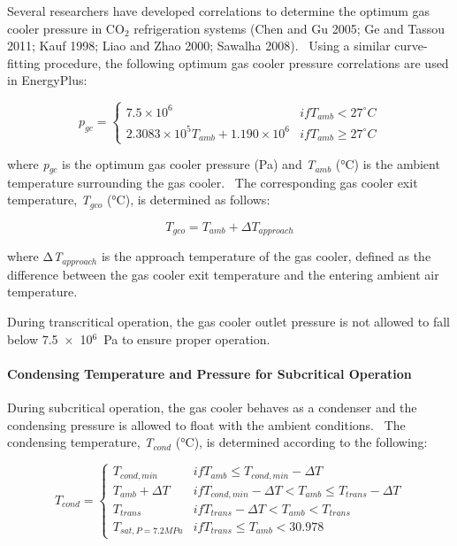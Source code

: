 Several researchers have developed correlations to determine the optimum gas cooler pressure in CO\(_{2}\) refrigeration systems (Chen and Gu 2005; Ge and Tassou 2011; Kauf 1998; Liao and Zhao 2000; Sawalha 2008).~ Using a similar curve-fitting procedure, the following optimum gas cooler pressure correlations are used in EnergyPlus:

\begin{equation}
  p_{gc} = \left\{
             \begin{array}{cl}
               7.5 \times 10^6                                & if T_{amb} <    27^{\circ}C \\
               2.3083 \times 10^5 T_{amb} + 1.190 \times 10^6 & if T_{amb} \geq 27^{\circ}C
             \end{array}
           \right.
\end{equation}

where \emph{p\(_{gc}\)} is the optimum gas cooler pressure (Pa) and \emph{T\(_{amb}\)} (°C) is the ambient temperature surrounding the gas cooler.~ The corresponding gas cooler exit temperature, \emph{T\(_{gco}\)} (°C), is determined as follows:

\begin{equation}
{T_{gco}} = {T_{amb}} + \Delta {T_{approach}}
\end{equation}

where Δ\emph{T\(_{approach}\)} is the approach temperature of the gas cooler, defined as the difference between the gas cooler exit temperature and the entering ambient air temperature.

During transcritical operation, the gas cooler outlet pressure is not allowed to fall below 7.5~×~10\(^{6}\)~Pa to ensure proper operation.

\paragraph{Condensing Temperature and Pressure for Subcritical Operation}\label{condensing-temperature-and-pressure-for-subcritical-operation}

During subcritical operation, the gas cooler behaves as a condenser and the condensing pressure is allowed to float with the ambient conditions.~ The condensing temperature, \emph{T\(_{cond}\)} (°C), is determined according to the following:

\begin{equation}
  T_{cond} = \left\{
               \begin{array}{cl}
                 T_{cond,min}                           & if T_{amb} \le T_{cond,min} - \Delta T \\
                 T_{amb} + \Delta T                     & if T_{cond,min} - \Delta T < T_{amb} \le T_{trans} - \Delta T \\
                 T_{trans}                              & if T_{trans} - \Delta T < T_{amb} < T_{trans} \\
                 T_{sat,P = 7.2MPa}                     & if T_{trans} \le {T_{amb}} < 30.978 
               \end{array}
             \right.
\end{equation}

